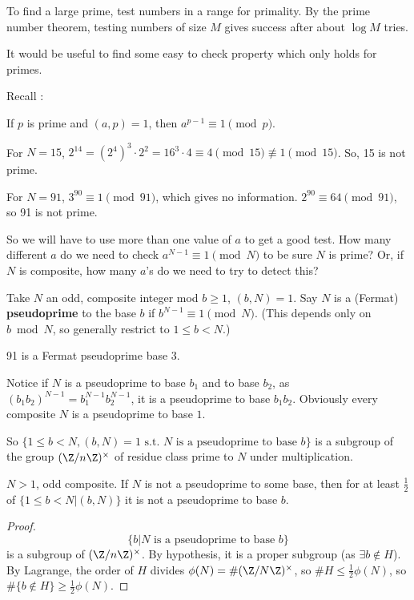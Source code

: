 \documentclass{article}
\begin{document}
To find a large prime, test numbers in a range for primality.
By the prime number theorem, testing numbers of size $M$ gives success after about $\log M$ tries.

It would be useful to find some easy to check property which only holds for primes.

Recall :
\begin{thm}
    If $p$ is prime and $(a, p)=1$, then $a^{p-1} \equiv 1 \pmod{p}$.
\end{thm}

\begin{eg}
    For $N=15$, $2^{14} = (2^4)^3 \cdot 2^2 = 16^3 \cdot 4 \equiv 4 \pmod{15} \not\equiv 1 \pmod{15}$. So, 15 is not prime.

    For $N=91$, $3^{90} \equiv 1 \pmod{91}$, which gives no information. $2^{90} \equiv 64 \pmod{91}$, so 91 is not prime.
\end{eg}

So we will have to use more than one value of $a$ to get a good test.
How many different $a$ do we need to check $a^{N-1} \equiv 1 \pmod{N}$ to be sure $N$ is prime?
Or, if $N$ is composite, how many $a$'s do we need to try to detect this?

\begin{defi}[Pseudoprime]
    Take $N$ an odd, composite integer mod $b \geq 1$, $(b, N) = 1$.
    Say $N$ is a (Fermat) \textbf{pseudoprime} to the base $b$ if $b^{N-1} \equiv 1 \pmod{N}$.
    (This depends only on $b \bmod{N}$, so generally restrict to $1 \leq b < N$.)
\end{defi}

\begin{eg}
    91 is a Fermat pseudoprime base 3.
\end{eg}

Notice if $N$ is a pseudoprime to base $b_1$ and to base $b_2$, as $(b_1 b_2)^{N-1} = b_1^{N-1} b_2^{N-1}$, it is a pseudoprime to base $b_1 b_2$.
Obviously every composite $N$ is a pseudoprime to base $1$.

So $\{1 \leq b < N, (b, N) = 1 \text{ s.t. $N$ is a pseudoprime to base } b\}$ is a subgroup of the group $(\Z/n\Z)^\times$ of residue class prime to $N$ under multiplication.

\begin{nprop}\label{prop:7.1}
    $N>1$, odd composite. If $N$ is not a pseudoprime to some base, then for at least $\frac{1}{2}$ of $\{1 \leq b < N | (b, N)\}$ it is not a pseudoprime to base $b$.
\end{nprop}
\begin{proof}
    \begin{equation*}
        \{b | N \text{ is a pseudoprime to base } b\}
    \end{equation*}
    is a subgroup of $(\Z/n\Z)^\times$. By hypothesis, it is a proper subgroup (as $\exists b \notin H$).
    By Lagrange, the order of $H$ divides $\phi(N) = \# (\Z/N\Z)^\times$, so $\#H \leq \frac{1}{2} \phi(N)$, so $\#\{b \notin H\} \geq \frac{1}{2} \phi(N)$.
\end{proof}
\end{document}
